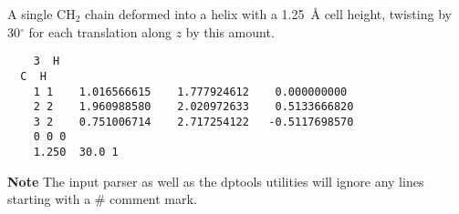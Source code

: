 A single CH$_2$ chain deformed into a helix with a 1.25~{\AA} cell
height, twisting by 30$^\circ$ for each translation along $z$ by this
amount.
\begin{verbatim}
    3  H
  C  H
    1 1    1.016566615    1.777924612    0.000000000
    2 2    1.960988580    2.020972633    0.5133666820
    3 2    0.751006714    2.717254122   -0.5117698570
    0 0 0
    1.250  30.0 1
\end{verbatim}

{\bf Note} The \dftbp{} input parser as well as the dptools utilities will
ignore any lines starting with a \# comment mark.
